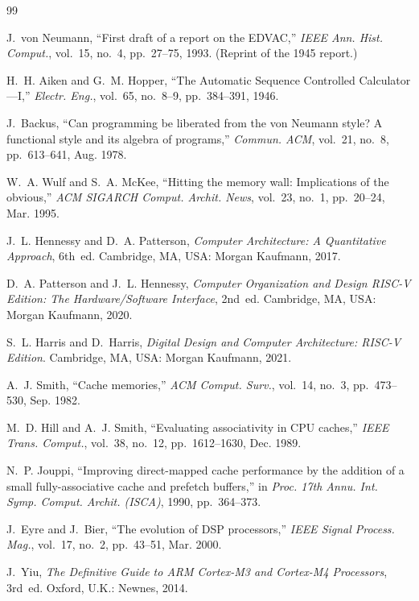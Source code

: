 \documentclass[conference]{IEEEtran}
\begin{document}
\begin{thebibliography}{99}

J.~von Neumann, ``First draft of a report on the EDVAC,'' \emph{IEEE Ann. Hist. Comput.}, vol.~15, no.~4, pp.~27--75, 1993. (Reprint of the 1945 report.)

H.~H. Aiken and G.~M. Hopper, ``The Automatic Sequence Controlled Calculator---I,'' \emph{Electr. Eng.}, vol.~65, no.~8--9, pp.~384--391, 1946.

J.~Backus, ``Can programming be liberated from the von Neumann style? A functional style and its algebra of programs,'' \emph{Commun. ACM}, vol.~21, no.~8, pp.~613--641, Aug. 1978.

W.~A. Wulf and S.~A. McKee, ``Hitting the memory wall: Implications of the obvious,'' \emph{ACM SIGARCH Comput. Archit. News}, vol.~23, no.~1, pp.~20--24, Mar. 1995.

J.~L. Hennessy and D.~A. Patterson, \emph{Computer Architecture: A Quantitative Approach}, 6th~ed. Cambridge, MA, USA: Morgan Kaufmann, 2017.

D.~A. Patterson and J.~L. Hennessy, \emph{Computer Organization and Design RISC-V Edition: The Hardware/Software Interface}, 2nd~ed. Cambridge, MA, USA: Morgan Kaufmann, 2020.

S.~L. Harris and D.~Harris, \emph{Digital Design and Computer Architecture: RISC-V Edition}. Cambridge, MA, USA: Morgan Kaufmann, 2021.

A.~J. Smith, ``Cache memories,'' \emph{ACM Comput. Surv.}, vol.~14, no.~3, pp.~473--530, Sep. 1982.

M.~D. Hill and A.~J. Smith, ``Evaluating associativity in CPU caches,'' \emph{IEEE Trans. Comput.}, vol.~38, no.~12, pp.~1612--1630, Dec. 1989.

N.~P. Jouppi, ``Improving direct-mapped cache performance by the addition of a small fully-associative cache and prefetch buffers,'' in \emph{Proc. 17th Annu. Int. Symp. Comput. Archit. (ISCA)}, 1990, pp.~364--373.

J.~Eyre and J.~Bier, ``The evolution of DSP processors,'' \emph{IEEE Signal Process. Mag.}, vol.~17, no.~2, pp.~43--51, Mar. 2000.

J.~Yiu, \emph{The Definitive Guide to ARM Cortex-M3 and Cortex-M4 Processors}, 3rd~ed. Oxford, U.K.: Newnes, 2014.


\end{thebibliography}
\end{document}
